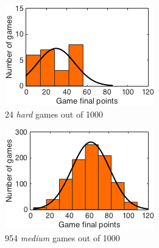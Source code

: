 \begin{figure}[h]
        \centering
        \begin{subfigure}[h]{0.32\textwidth}
                \includegraphics[width=\textwidth]{./img/appendix/histEhard}
                \caption{24 \emph{hard} games out of 1000}
                \label{app:histEhard}
        \end{subfigure}
        \begin{subfigure}[h]{0.32\textwidth}
                \includegraphics[width=\textwidth]{./img/appendix/histEmedium}
                \caption{954 \emph{medium} games out of 1000}
                \label{app:histEmedium}
        \end{subfigure}
        \begin{subfigure}[h]{0.32\textwidth}

\end{subfigure}
\end{figure}
